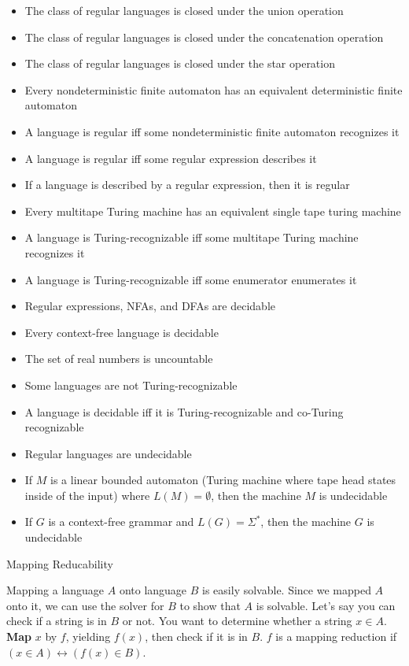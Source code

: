 \documentclass[2pt,legalpaper]{scrartcl}
\makeatletter
\renewcommand{\section}{\@startsection{section}{1}{0mm}
  {-1ex plus -.5ex minus -.2ex}
  {0.5ex plus .2ex}
{\normalfont\large\bfseries}}
\makeatother
\begin{document}
\begin{multicols}{6}
  \begin{itemize}
    \item The class of regular languages is closed under the union operation
    \item The class of regular languages is closed under the concatenation operation
    \item The class of regular languages is closed under the star operation
    \item Every nondeterministic finite automaton has an equivalent deterministic finite automaton
    \item A language is regular iff some nondeterministic finite automaton recognizes it
    \item A language is regular iff some regular expression describes it
    \item If a language is described by a regular expression, then it is regular
    \item Every multitape Turing machine has an equivalent single tape turing machine
    \item A language is Turing-recognizable iff some multitape Turing machine recognizes it
    \item A language is Turing-recognizable iff some enumerator enumerates it
    \item Regular expressions, NFAs, and DFAs are decidable
    \item Every context-free language is decidable
    \item The set of real numbers is uncountable
    \item Some languages are not Turing-recognizable
    \item A language is decidable iff it is Turing-recognizable and co-Turing recognizable
    \item Regular languages are undecidable
    \item If $M$ is a linear bounded automaton (Turing machine where tape head states inside of the input) where $L(M) = \emptyset$, then the machine $M$ is undecidable
    \item If $G$ is a context-free grammar and $L(G) = \Sigma^*$, then the machine $G$ is undecidable
  \end{itemize}

  \section{Mapping Reducability}

  Mapping a language $A$ onto language $B$ is easily solvable. Since we mapped $A$ onto it, we can use the solver for $B$ to show that $A$ is solvable. Let's say you can check if a string is in $B$ or not. You want to determine whether a string $x \in A$. {\bf Map} $x$ by $f$, yielding $f(x)$, then check if it is in $B$. $f$ is a mapping reduction if $(x \in A) \leftrightarrow (f(x) \in B)$.


\end{multicols}
\end{document}

